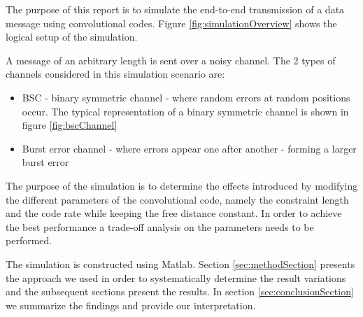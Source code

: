 The purpose of this report is to simulate the end-to-end transmission of a data message using convolutional codes. Figure \ref{fig:simulationOverview} shows the logical setup of the simulation.



A message of an arbitrary length is sent over a noisy channel. The 2 types of channels considered in this simulation scenario are:
\begin{itemize}
   \item BSC - binary symmetric channel - where random errors at random positions occur. The typical representation of a binary symmetric channel is shown in figure \ref{fig:bscChannel}
   \item Burst error channel - where errors appear one after another - forming a larger burst error
\end{itemize}



The purpose of the simulation is to determine the effects introduced by modifying the different parameters of the convolutional code, namely the constraint length and the code rate while keeping the free distance constant. In order to achieve the best performance a trade-off analysis on the parameters needs to be performed.

The simulation is constructed using Matlab. Section \ref{sec:methodSection} presents the approach we used in order to systematically determine the result variations and the subsequent sections present the results. In section \ref{sec:conclusionSection} we summarize the findings and provide our interpretation.


